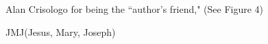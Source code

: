 \documentclass[10pt]{article}
\begin{document}
\vspace{2mm}\noindent\hspace{\parindent}Alan Crisologo for being the \textquotedblleft author's friend," (See Figure 4)

\vspace{2mm}\noindent\hspace{\parindent}\Cross\hspace{1mm}JMJ\hspace{1mm}\Cross\hspace{2mm}(Jesus, Mary, Joseph)



\end{document}
